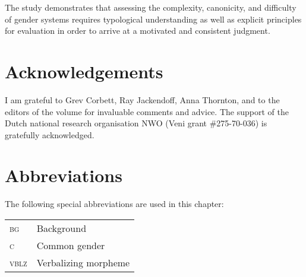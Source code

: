 \documentclass[output=collectionpaper]{langsci/langscibook}
\begin{document}
The study demonstrates that assessing the complexity, canonicity, and difficulty of gender systems requires typological understanding as well as explicit principles for evaluation in order to arrive at a motivated and consistent judgment.

\section*{Acknowledgements}

I am grateful to Grev Corbett, Ray Jackendoff, Anna Thornton, and to the editors of the volume for invaluable comments and advice. The support of the Dutch national research organisation NWO (Veni grant \#275-70-036) is gratefully acknowledged.

\section*{Abbreviations}

The following special abbreviations are used in this chapter:
\medskip

\begin{tabular}{ll}
\textsc{bg} & Background \\
\textsc{c} & Common gender \\
\textsc{vblz} & Verbalizing morpheme \\
\end{tabular}

\printbibliography[heading=subbibliography,notkeyword=this]

\label{lastpage:Audring}
\end{document}
